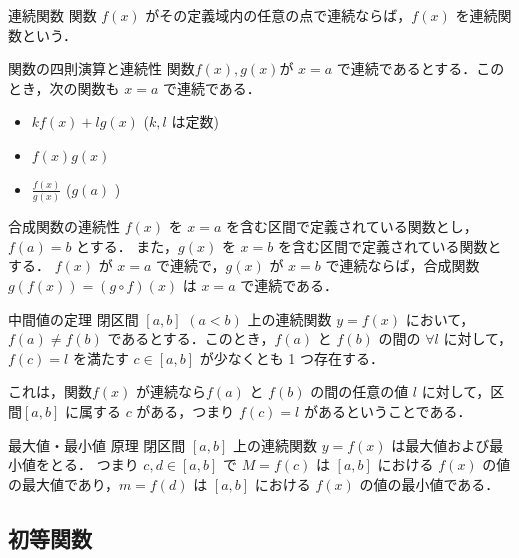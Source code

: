 \documentclass[a4paper]{ltjsarticle}
\begin{document}
  \begin{tcb}{連続関数}{}
    関数 $f(x)$ がその定義域内の任意の点で連続ならば，$f(x)$ を連続関数という．
  \end{tcb}

  \begin{theorem}{関数の四則演算と連続性}{}
    関数$f(x), g(x)$が $x = a$ で連続であるとする．このとき，次の関数も $x=a$ で連続である．
    \begin{itemize}
      \item $kf(x) + lg(x)$ ($k, l$ は定数)
      \item $f(x)g(x)$
      \item $\frac{f(x)}{g(x)}$ ($g(a)$ )
    \end{itemize}
  \end{theorem}

  \begin{theorem}{合成関数の連続性}{}
    $f(x)$ を $x = a$ を含む区間で定義されている関数とし，$f(a) = b$ とする．
    また，$g(x)$ を $x = b$ を含む区間で定義されている関数とする．
    $f(x)$ が $x = a$ で連続で，$g(x)$ が $x = b$ で連続ならば，合成関数 $g(f(x)) = (g \circ f)(x)$ は $x=a$ で連続である．
  \end{theorem}

  \begin{theorem}{中間値の定理}{}
    閉区間 $[a, b]$ $(a < b)$ 上の連続関数 $y = f(x)$ において，$f(a) \neq f(b)$ であるとする．このとき，$f(a)$ と $f(b)$ の間の $\forall l$ に対して，$f(c) = l$ を満たす $c \in [a, b]$ が少なくとも 1 つ存在する．   
  \end{theorem}
  これは，関数$f(x)$ が連続なら$f(a)$ と $f(b)$ の間の任意の値 $l$ に対して，区間$[a, b]$ に属する $c$ がある，つまり $f(c) = l$ があるということである．

  \begin{theorem}{最大値・最小値 原理}{}
  閉区間 $[a, b]$ 上の連続関数 $y = f(x)$ は最大値および最小値をとる．
  つまり $c, d \in [a, b]$ で $M = f(c)$ は $[a, b]$ における $f(x)$ の値の最大値であり，$m = f(d)$ は $[a, b]$ における $f(x)$ の値の最小値である．
  \end{theorem}

  \subsection{初等関数}
\end{document}
